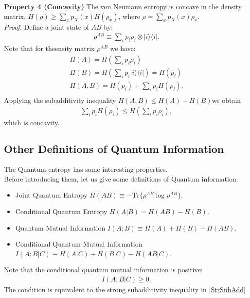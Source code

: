 \textbf{Property 4 (Concavity)}
The von Neumann entropy is concave in the density matrix, $H(\rho) \geq \sum_x p_X(x) H(\rho_x)$, where $\rho = \sum_x p_X(x)\rho_x$. \\
\textit{Proof.} Define a joint state of $AB$ by:
\begin{align*}
\rho^{AB} \equiv \sum_i p_i \rho_i \otimes |i\rangle \langle i|.
\end{align*}
Note that for theensity matrix $\rho^{AB}$ we have:
\begin{align*}
H(A)=H(\sum_i p_i \rho_i) \\
H(B)=H(\sum_i p_i |i \rangle \langle i|)=H(p_i) \\
H(A,B)=H(p_i)+\sum_i p_i H(\rho_i). \\
\end{align*}
Applying the subadditivity inequality $H(A,B) \leq H(A)+H(B)$we obtain
\begin{align*}
\sum_i p_i H(\rho_i) \leq H(\sum_i p_i \rho_i),
\end{align*}
which is concavity.

\subsection{Other Definitions of Quantum Information}
The Quantum entropy has some interesting properties. \\
Before introducing them, let us give some definitions of Quantum information: \\
\begin{itemize}
	\item {\color{red}Joint Quantum Entropy} $H(AB) \equiv -\text{Tr}\{\rho^{AB} \log \rho^{AB}\}$.
	\item {\color{red}Conditional Quantum Entropy} $H(A|B) = H(AB) - H(B)$.
	\item {\color{red}Quantum Mutual Information} $I(A;B) \equiv H(A)+H(B)-H(AB)$.
	\item {\color{red}Conditional Quantum Mutual Information} $I(A;B|C) \equiv H(A|C)+H(B|C)-H(AB|C)$.
\end{itemize}
Note that the conditional quantum mutual information is positive:
\begin{align*}
I(A;B|C) \geq 0.
\end{align*}
The condition is equivalent to the strong subadditivity inequality in \ref{StrSubAdd}

